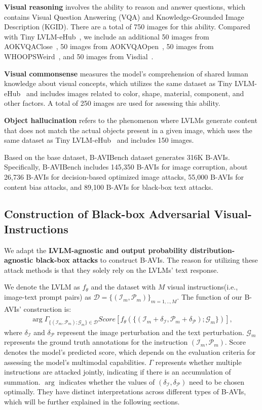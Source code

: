 \textbf{Visual reasoning} involves the ability to reason and answer questions, which contains Visual Question Answering (VQA) and Knowledge-Grounded Image Description (KGID). There are a total of 750 images for this ability. Compared with Tiny LVLM-eHub~\cite{shao2023tiny}, we include an additional 50 images from AOKVQAClose~\cite{schwenk2022okvqa}, 50 images from AOKVQAOpen~\cite{schwenk2022okvqa}, 50 images from WHOOPSWeird~\cite{bitton2023breakingwhoops}, and 50 images from Visdial~\cite{das2017visual}.

\textbf{Visual commonsense} measures the model's comprehension of shared human knowledge about visual concepts, which utilizes the same dataset as Tiny LVLM-eHub~\cite{shao2023tiny} and includes images related to color, shape, material, component, and other factors. A total of 250 images are used for assessing this ability.

\textbf{Object hallucination} refers to the phenomenon where LVLMs generate content that does not match the actual objects present in a given image, which uses the same dataset as Tiny LVLM-eHub~\cite{shao2023tiny} and includes 150 images.

Based on the base dataset, B-AVIBench dataset generates 316K B-AVIs. Specifically, B-AVIBench includes 145,350 B-AVIs for image corruption, about 26,736 B-AVIs for decision-based optimized image attacks, 55,000 B-AVIs for content bias attacks, and 89,100 B-AVIs for black-box text attacks.

\subsection{Construction of Black-box Adversarial Visual-Instructions}
We adapt the \textbf{LVLM-agnostic and output probability distribution-agnostic black-box attacks} to construct B-AVIs. The reason for utilizing these attack methods is that they solely rely on the LVLMs' text response.

We denote the LVLM as $f_{\theta}$ and the dataset with $M$ visual instructions(i.e., image-text prompt pairs) as $\mathcal{D}=\{(\mathcal{I}_m,\mathcal{P}_m)\}_{m=1,..,M}$. The function of our B-AVIs' construction is:
\begin{align}
\label{eq-attack}
\mathop{\arg } 
\Gamma_{\{(\mathcal{I}_m,\mathcal{P}_m); \mathcal{G}_{m}\} \in \mathcal{D}} {Score} [f_\theta(\{(\mathcal{I}_m+\delta_{\mathcal{I}},
\mathcal{P}_m+\delta_{\mathcal{P}}); \mathcal{G}_{m}\})],
\end{align}
where $\delta_{\mathcal{I}}$ and $\delta_{\mathcal{P}}$ represent the image perturbation and the text perturbation. 
$\mathcal{G}_{m}$ represents the ground truth annotations for the instruction $(\mathcal{I}_m,\mathcal{P}_m)$. 
$\text{Score}$ denotes the model's predicted score, which depends on the evaluation criteria for assessing the model's multimodal capabilities.
$\Gamma$ represents whether multiple instructions are attacked jointly, indicating if there is an accumulation of summation. $\mathop{\arg}$ indicates whether the values of $(\delta_{\mathcal{I}}, \delta_{\mathcal{P}})$ need to be chosen optimally. They have distinct interpretations across different types of B-AVIs, which will be further explained in the following sections.

